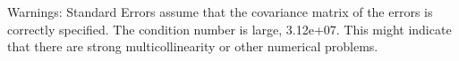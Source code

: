 Warnings: \newline
 [1] Standard Errors assume that the covariance matrix of the errors is correctly specified. \newline
 [2] The condition number is large, 3.12e+07. This might indicate that there are \newline
 strong multicollinearity or other numerical problems.